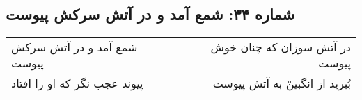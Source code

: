 \begin{center}
\section*{شماره ۳۴: شمع آمد و در آتش سرکش پیوست}
\label{sec:034}
\begin{longtable}{l p{0.5cm} r}
شمع آمد و در آتش سرکش پیوست
&&
در آتش سوزان که چنان خوش پیوست
\\
پیوند عجب نگر که او را افتاد
&&
بُبرید از انگبینْ به آتش پیوست
\\
\end{longtable}
\end{center}
